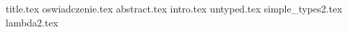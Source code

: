 \documentclass[a4paper,oneside,twoside,reqno,12pt,openright]{article}
\begin{document}
\thispagestyle{empty}
{title.tex}
\newpage
\thispagestyle{empty}
\null
\newpage
\thispagestyle{empty}
{oswiadczenie.tex}
\newpage
\thispagestyle{empty}
\null
\newpage
\thispagestyle{empty}
\tableofcontents
\newpage
\thispagestyle{empty}
\null
\newpage
\thispagestyle{empty}
{abstract.tex}
\newpage
\setcounter{page}{1}
{intro.tex}
\newpage
{untyped.tex}
\newpage
{simple_types2.tex}
\newpage
{lambda2.tex}
%

\newpage
\printbibliography[title=Literatura]
\end{document}
